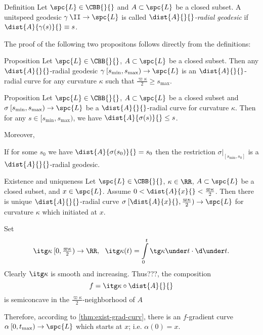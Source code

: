 \begin{thm}{Definition}\label{def:rad-geod}
Let $\spc{L}\in\CBB{}{}$
and $A\subset \spc{L}$ be a closed subset.
A unitspeed geodesic  $\gamma\:\II\to \spc{L}$  is called 
\emph{$\dist{A}{}{}$-radial geodesic} if 
$\dist{A}{\gamma(s)}{}\equiv s$.
\end{thm}

The proof of the following two propositons follows directly from the definitions: 

\begin{thm}{Proposition}
Let $\spc{L}\in\CBB{}{}$,
$A\subset\spc{L}$ be a closed subset.
Then any $\dist{A}{}{}$-radial geodesic 
$\gamma\:[s_{\min},s_{\max})
\to 
\spc{L}$ 
is an $\dist{A}{}{}$-radial curve for any curvature $\kappa$ such that $\tfrac{\varpi\kappa}{2}
\ge 
s_{\max}$.
\end{thm}

\begin{thm}{Proposition}\label{prop:dist<s}
Let $\spc{L}\in\CBB{}{}$,
$A\subset\spc{L}$ be a closed subset 
and $\sigma\:[s_{\min},s_{\max})\to \spc{L}$ be a $\dist{A}{}{}$-radial curve for curvature $\kappa$.
Then for any $s\in [s_{\min},s_{\max})$, 
we have $\dist{A}{\sigma(s)}{}\le s$.

Moreover, 
\begin{subthm}{}
If for some $s_0$ we have $\dist{A}{\sigma(s_0)}{}= s_0$ 
then the restriction $\sigma|_{[s_{\min},s_0]}$ is a $\dist{A}{}{}$-radial geodesic.
\end{subthm}
\end{thm}

\begin{thm}{Existence and uniqueness}\label{rad-curv-exist}
Let $\spc{L}\in\CBB{}{}$, 
$\kappa\in\RR$, 
$A\subset\spc{L}$ be a closed subset, 
and $x\in \spc{L}$.
Assume
$0
<
\dist{A}{x}{}
<
\tfrac{\varpi\kappa}2$.
Then there is unique $\dist{A}{}{}$-radial curve $\sigma\:[\dist{A}{x}{},\tfrac{\varpi\kappa}2)\to \spc{L}$ 
for curvature $\kappa$
which initiated at $x$.
\end{thm}


Set\index{$\itg\kappa$} 
$$\itg\kappa\:[0,\tfrac{\varpi\kappa}2)\to\RR,
\ \ 
\itg\kappa (t)=\int\limits_0^t\tg\kappa\under t\cdot\d\under t.$$
Clearly $\itg\kappa$ is smooth and increasing.
Thus???, the composition 
$$f=\itg\kappa\circ\dist{A}{}{}$$ 
is semiconcave in the $\tfrac{\varpi\kappa}2$-neighborhood of $A$

Therefore, according to \ref{thm:exist-grad-curv}, there is an $f$-gradient curve $\alpha\:[0,t_{\max})\to \spc{L}$ which starts at $x$; i.e. $\alpha(0)=x$.

